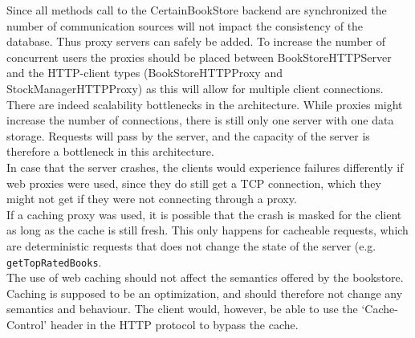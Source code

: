 \documentclass[11pt]{article}
\begin{document}

Since all methods call to the CertainBookStore backend are synchronized the number of communication sources will not impact the consistency of the database. Thus proxy servers can safely be added. To increase the number of concurrent users the proxies should be placed between BookStoreHTTPServer and the HTTP-client types (BookStoreHTTPProxy and StockManagerHTTPProxy) as this will allow for multiple client connections.\\


There are indeed scalability bottlenecks in the architecture. While proxies might increase the number of connections, there is still only one server with one data storage. Requests will pass by the server, and the capacity of the server is therefore a bottleneck in this architecture.\\


In case that the server crashes, the clients would experience failures differently if web proxies were used, since they do still get a TCP connection, which they might not get if they were not connecting through a proxy.\\

If a caching proxy was used, it is possible that the crash is masked for the client as long as the cache is still fresh. This only happens for cacheable requests, which are deterministic requests that does not change the state of the server (e.g. \texttt{getTopRatedBooks}.\\

The use of web caching should not affect the semantics offered by the bookstore. Caching is supposed to be an optimization, and should therefore not change any semantics and behaviour. The client would, however, be able to use the ‘Cache-Control’ header in the HTTP protocol to bypass the cache.\\
\end{document}
